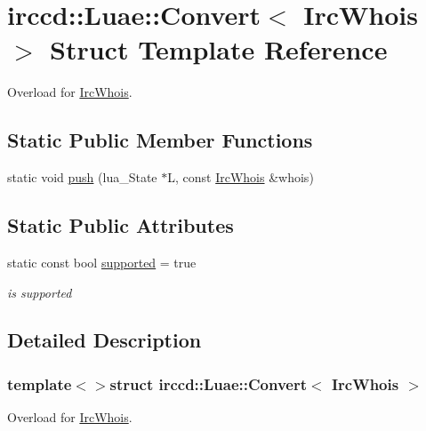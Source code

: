 \hypertarget{a00012}{\section{irccd\-:\-:Luae\-:\-:Convert$<$ Irc\-Whois $>$ Struct Template Reference}
\label{a00012}
}


Overload for \hyperlink{a00036}{Irc\-Whois}.  


\subsection*{Static Public Member Functions}
\begin{DoxyCompactItemize}
\item 
static void \hyperlink{a00012_a97be5c3b15070b200d23195788eefe2b}{push} (lua\-\_\-\-State $\ast$L, const \hyperlink{a00036}{Irc\-Whois} \&whois)
\end{DoxyCompactItemize}
\subsection*{Static Public Attributes}
\begin{DoxyCompactItemize}
\item 
\hypertarget{a00012_ab226a24a6de6d2b794cffc1ba891594a}{static const bool \hyperlink{a00012_ab226a24a6de6d2b794cffc1ba891594a}{supported} = true}\label{a00012_ab226a24a6de6d2b794cffc1ba891594a}

\begin{DoxyCompactList}\small\item\em is supported \end{DoxyCompactList}\end{DoxyCompactItemize}


\subsection{Detailed Description}
\subsubsection*{template$<$$>$struct irccd\-::\-Luae\-::\-Convert$<$ Irc\-Whois $>$}

Overload for \hyperlink{a00036}{Irc\-Whois}. 

